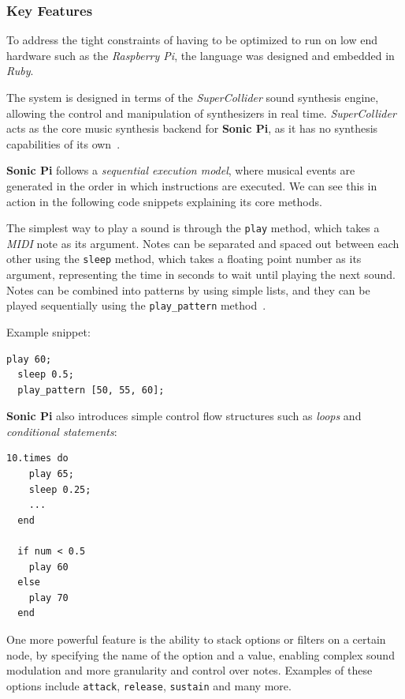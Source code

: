 
\subsubsection{Key Features}

To address the tight constraints of having to be optimized to run on low end hardware such as the \textit{Raspberry Pi},
the language was designed and embedded in \textit{Ruby}.

The system is designed in terms of the \textit{SuperCollider} sound synthesis engine, allowing the control
and manipulation of synthesizers in real time.
\textit{SuperCollider} acts as the core music synthesis backend for \textbf{Sonic Pi}, as it has no synthesis
capabilities of its own~\cite{Aaron_Blackwell_2013}.

\textbf{Sonic Pi} follows a \textit{sequential execution model}, where musical events are generated in the order in
which instructions are executed.
We can see this in action in the following code snippets explaining its core methods.

The simplest way to play a sound is through the \texttt{play} method, which takes a \textit{MIDI} note as its argument.
Notes can be separated and spaced out between each other using the \texttt{sleep} method, which takes a floating point
number as its argument, representing the time in seconds to wait until playing the next sound.
Notes can be combined into patterns by using simple lists, and they can be played sequentially using the
\texttt{play\_pattern} method~\cite{Aaron_Blackwell_2013}.

Example snippet:
\begin{lstlisting}[label={detail-lst:sonic-pi-1}]
  play 60;
  sleep 0.5;
  play_pattern [50, 55, 60];
\end{lstlisting}

\textbf{Sonic Pi} also introduces simple control flow structures such as \textit{loops} and
\textit{conditional statements}:
\begin{lstlisting}[label={detail-lst:loops-and-conditional-statements}]
  10.times do
    play 65;
    sleep 0.25;
    ...
  end

  if num < 0.5
    play 60
  else
    play 70
  end
\end{lstlisting}

One more powerful feature is the ability to stack options or filters on a certain node, by specifying the name of the
option and a value, enabling complex sound modulation and more granularity and control over notes.
Examples of these options include \texttt{attack}, \texttt{release}, \texttt{sustain} and many more.

